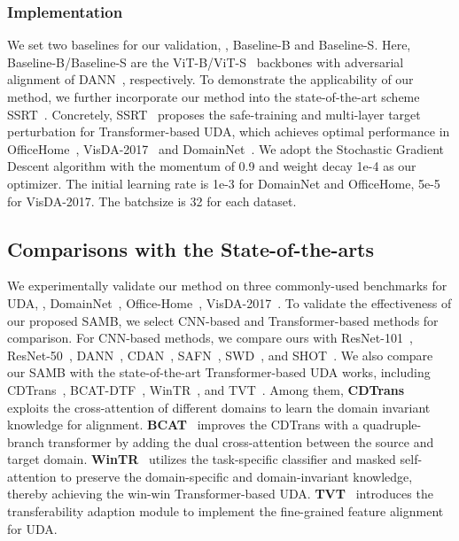 \documentclass[journal]{IEEEtran}
\begin{document}
\subsubsection{Implementation}
We set two baselines for our validation, \ieno, Baseline-B and Baseline-S. Here, Baseline-B/Baseline-S are the ViT-B/ViT-S~\cite{dosovitskiy2020imageViT} backbones with adversarial alignment of DANN~\cite{ganin2016domain_dann}, respectively.   
To demonstrate the applicability of our method, we further incorporate our method into the state-of-the-art scheme SSRT~\cite{sun2022safeSSRT}. 
Concretely, SSRT~\cite{sun2022safeSSRT} proposes the safe-training and multi-layer target perturbation for Transformer-based UDA, which achieves optimal performance in OfficeHome~\cite{venkateswara2017deepOffice-Home}, VisDA-2017~\cite{peng2017visdaViSDA2017} and DomainNet~\cite{peng2019momentDomainNet}.  We adopt the  Stochastic Gradient Descent algorithm with the momentum of 0.9 and weight decay 1e-4 as our optimizer. The initial learning rate is 1e-3 for DomainNet and OfficeHome, 5e-5 for VisDA-2017. The batchsize is 32 for each dataset. 




\subsection{Comparisons with the State-of-the-arts}
\label{sec:sota}
We experimentally validate our method on three commonly-used benchmarks for UDA, \ieno, DomainNet~\cite{peng2019momentDomainNet}, Office-Home~\cite{venkateswara2017deepOffice-Home}, VisDA-2017~\cite{peng2017visdaViSDA2017}.  To validate the effectiveness of our proposed SAMB, we select CNN-based and Transformer-based methods for comparison. For CNN-based methods, we compare ours with ResNet-101~\cite{he2016deepResNet}, ResNet-50~\cite{he2016deepResNet}, DANN~\cite{ganin2016domain_dann}, CDAN~\cite{long2018conditionalCDAN}, SAFN~\cite{xu2019largerSAFN}, SWD~\cite{lee2019slicedSWD}, and SHOT~\cite{liang2020weSHOT}. We also compare our SAMB with the state-of-the-art Transformer-based UDA works, including CDTrans~\cite{xu2021cdtransCDTrans}, BCAT-DTF~\cite{wang2022domainBCAT}, WinTR~\cite{ma2021exploitingWinTR}, and TVT~\cite{yang2021tvtTVT}. Among them, \textbf{CDTrans}~\cite{xu2021cdtransCDTrans} exploits the cross-attention of different domains to learn the domain invariant knowledge for alignment. \textbf{BCAT}~\cite{wang2022domainBCAT} improves the CDTrans with a quadruple-branch transformer by adding the dual cross-attention between the source and target domain. \textbf{WinTR}~\cite{ma2021exploitingWinTR} utilizes the task-specific classifier and masked self-attention to preserve the domain-specific and domain-invariant knowledge, thereby achieving the win-win Transformer-based UDA. \textbf{TVT}~\cite{yang2021tvtTVT} introduces the transferability adaption module to implement the fine-grained feature alignment for UDA. 
\end{document}
